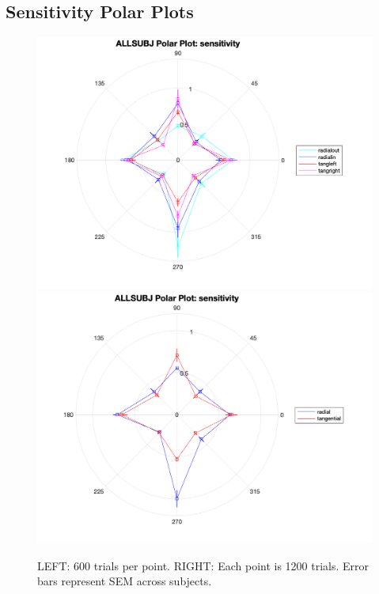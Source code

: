 \documentclass[11pt]{article} %
\begin{document}
\subsection{Sensitivity Polar Plots}
\begin{figure}[H]
\centering %
\includegraphics[scale=.35]{Images/ALLSUBJ_PP_sensitivity_Alldata_4conds.png}
\includegraphics[scale=.35]{Images/ALLSUBJ_PP_sensitivity_Alldata_2conds.png}
\caption{LEFT: 600 trials per point. RIGHT: Each point is 1200 trials. Error bars represent SEM across subjects.}
\end{figure}
\end{document}

